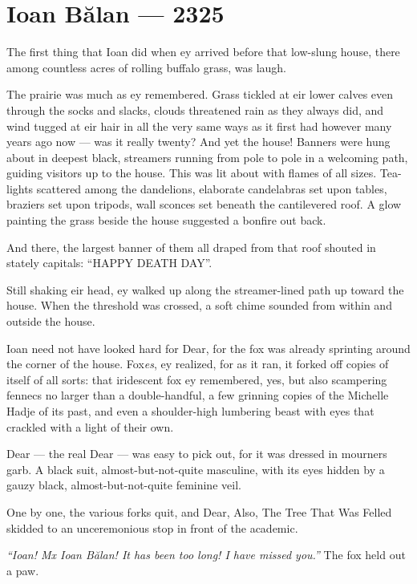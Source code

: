 \hypertarget{ioan-bux103lan-2325}{%
\chapter{Ioan Bălan — 2325}\label{ioan-bux103lan-2325}}

The first thing that Ioan did when ey arrived before that low-slung house, there among countless acres of rolling buffalo grass, was laugh.

The prairie was much as ey remembered. Grass tickled at eir lower calves even through the socks and slacks, clouds threatened rain as they always did, and wind tugged at eir hair in all the very same ways as it first had however many years ago now — was it really twenty? And yet the house! Banners were hung about in deepest black, streamers running from pole to pole in a welcoming path, guiding visitors up to the house. This was lit about with flames of all sizes. Tea-lights scattered among the dandelions, elaborate candelabras set upon tables, braziers set upon tripods, wall sconces set beneath the cantilevered roof. A glow painting the grass beside the house suggested a bonfire out back.

And there, the largest banner of them all draped from that roof shouted in stately capitals: ``HAPPY DEATH DAY''.

Still shaking eir head, ey walked up along the streamer-lined path up toward the house. When the threshold was crossed, a soft chime sounded from within and outside the house.

Ioan need not have looked hard for Dear, for the fox was already sprinting around the corner of the house. Fox\emph{es}, ey realized, for as it ran, it forked off copies of itself of all sorts: that iridescent fox ey remembered, yes, but also scampering fennecs no larger than a double-handful, a few grinning copies of the Michelle Hadje of its past, and even a shoulder-high lumbering beast with eyes that crackled with a light of their own.

Dear — the real Dear — was easy to pick out, for it was dressed in mourners garb. A black suit, almost-but-not-quite masculine, with its eyes hidden by a gauzy black, almost-but-not-quite feminine veil.

One by one, the various forks quit, and Dear, Also, The Tree That Was Felled skidded to an unceremonious stop in front of the academic.

\emph{``Ioan! Mx Ioan Bălan! It has been too long! I have missed you.''} The fox held out a paw.

